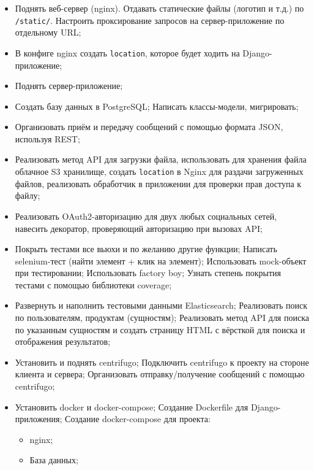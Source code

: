 \documentclass[a4paper,12pt]{article}
\begin{document}
\begin{itemize}[leftmargin=1.2cm]
  \item Поднять веб-сервер (nginx). Отдавать статические файлы (логотип и т.д.) по \texttt{/static/}. Настроить проксирование запросов на сервер-приложение по отдельному URL;

  \item В конфиге nginx создать \texttt{location}, которое будет ходить на Django-приложение;

  \item Поднять сервер-приложение;

  \item Создать базу данных в PostgreSQL; Написать классы-модели, мигрировать;

  \item Организовать приём и передачу сообщений с помощью формата JSON, используя REST;

  \item Реализовать метод API для загрузки файла, использовать для хранения файла облачное S3 хранилище, создать \texttt{location} в Nginx для раздачи загруженных файлов, реализовать обработчик в приложении для проверки прав доступа к файлу;

  \item Реализовать OAuth2-авторизацию для двух любых социальных сетей, навесить декоратор, проверяющий авторизацию при вызовах API;

  \item Покрыть тестами все вьюхи и по желанию другие функции; Написать selenium-тест (найти элемент + клик на элемент); Использовать mock-объект при тестировании; Использовать factory boy; Узнать степень покрытия тестами с помощью библиотеки coverage;

  \item Развернуть и наполнить тестовыми данными Elasticsearch; Реализовать поиск по пользователям, продуктам (сущностям); Реализовать метод API для поиска по указанным сущностям и создать страницу HTML с вёрсткой для поиска и отображения результатов;

  \item Установить и поднять centrifugo; Подключить centrifugo к проекту на стороне клиента и сервера; Организовать отправку/получение сообщений с помощью centrifugo;

  \item Установить docker и docker-compose; Создание Dockerfile для Django-приложения; Создание docker-compose для проекта:
  \begin{itemize}
      \item nginx;
      \item База данных;
    \end{itemize}  %


\end{itemize}
\end{document}
